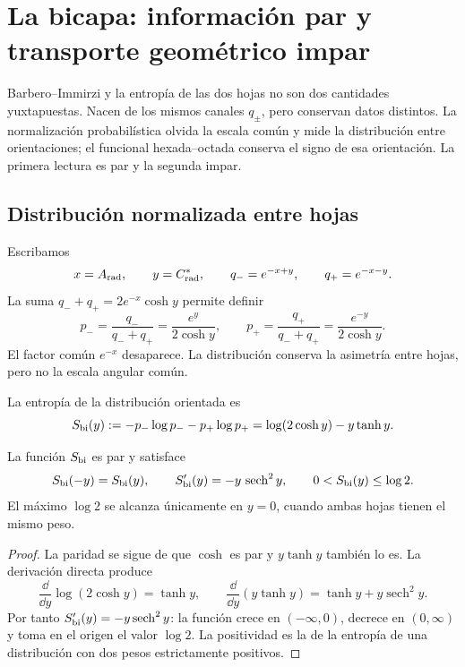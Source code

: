 \chapter{La bicapa: información par y transporte geométrico impar}
\label{chap:paridad-bicapa-barbero-rev6}

Barbero--Immirzi y la entropía de las dos hojas no son dos cantidades
yuxtapuestas. Nacen de los mismos canales \(q_\pm\), pero conservan datos
distintos. La normalización probabilística olvida la escala común y mide la
distribución entre orientaciones; el funcional hexada--octada conserva el
signo de esa orientación. La primera lectura es par y la segunda impar.

\section{Distribución normalizada entre hojas}

Escribamos
\[
 x=A_{\rm rad},
 \qquad
 y=C^*_{\rm rad},
 \qquad
 q_-=e^{-x+y},
 \qquad
 q_+=e^{-x-y}.
\]
La suma \(q_-+q_+=2e^{-x}\cosh y\) permite definir
\[
 p_-=\frac{q_-}{q_-+q_+}
     =\frac{e^y}{2\cosh y},
 \qquad
 p_+=\frac{q_+}{q_-+q_+}
     =\frac{e^{-y}}{2\cosh y}.
\]
El factor común \(e^{-x}\) desaparece. La distribución conserva la asimetría
entre hojas, pero no la escala angular común.

\begin{definition}
\label{def:entropia-bicapa-rev6}
La entropía de la distribución orientada es
\[
 S_{\rm bi}(y)
 :=
 -p_-\log p_--p_+\log p_+
 =
 \log(2\cosh y)-y\tanh y.
\]
\end{definition}

\begin{proposition}
\label{prop:paridad-entropia-bicapa-rev6}
La función \(S_{\rm bi}\) es par y satisface
\[
 S_{\rm bi}(-y)=S_{\rm bi}(y),
 \qquad
 S_{\rm bi}'(y)=-y\,\operatorname{sech}^2y,
 \qquad
 0<S_{\rm bi}(y)\leq\log2.
\]
El máximo \(\log2\) se alcanza únicamente en \(y=0\), cuando ambas hojas
tienen el mismo peso.
\end{proposition}

\begin{proof}
La paridad se sigue de que \(\cosh\) es par y \(y\tanh y\) también lo es.
La derivación directa produce
\[
 \frac{\dd}{\dd y}\log(2\cosh y)=\tanh y,
 \qquad
 \frac{\dd}{\dd y}(y\tanh y)
 =\tanh y+y\operatorname{sech}^2y.
\]
Por tanto \(S_{\rm bi}'(y)=-y\operatorname{sech}^2y\): la función crece en
\((-\infty,0)\), decrece en \((0,\infty)\) y toma en el origen el valor
\(\log2\). La positividad es la de la entropía de una distribución con dos
pesos estrictamente positivos.
\end{proof}

